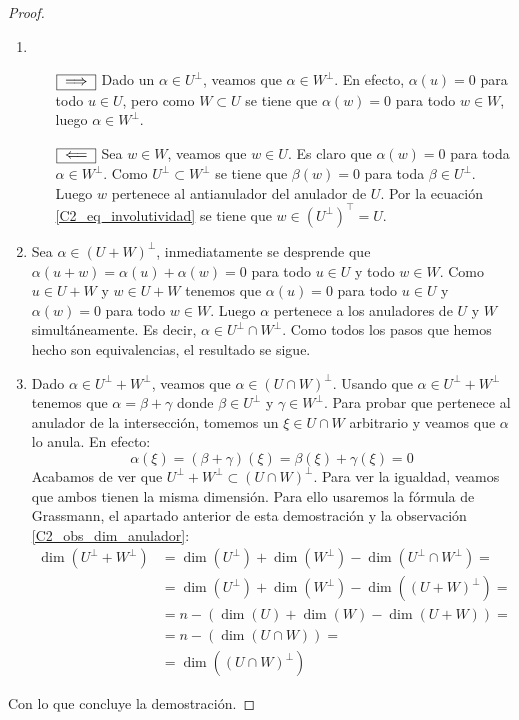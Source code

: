 \begin{proof}
	\begin{enumerate}
		\item \ \ \begin{itemize}
			\item[$\fbox{$\implies$}$] Dado un $\alpha\in U^\perp$, veamos que $\alpha\in W^\perp$. En efecto, $\alpha(u)=0$ para todo $u\in U$, pero como $W\subset U$ se tiene que $\alpha(w)=0$ para todo $w\in W$, luego $\alpha\in W^\perp$.
			
			\item[$\fbox{$\impliedby$}$] Sea $w\in W$, veamos que $w\in U$. Es claro que $\alpha(w)=0$ para toda $\alpha \in W^{\perp}$. Como $U^{\perp}\subset W^{\perp}$ se tiene que $\beta (w)=0$ para toda $\beta\in U^{\perp}$. Luego $w$ pertenece al antianulador del anulador de $U$. Por la ecuación \eqref{C2_eq_involutividad} se tiene que $w\in (U^\perp)^\top=U$.
		\end{itemize}
		
		
		\item Sea $\alpha\in(U+W)^\perp$, inmediatamente se desprende que $\alpha(u+w)=\alpha(u)+\alpha(w)=0$ para todo $u\in U$ y todo $w\in W$. Como $u\in U+W$ y $w\in U+W$ tenemos que $\alpha(u)=0$ para todo $u\in U$ y $\alpha(w)=0$ para todo $w\in W$. Luego $\alpha$ pertenece a los anuladores de $U$ y $W$ simultáneamente. Es decir, $\alpha\in U^\perp\cap W^\perp$. Como todos los pasos que hemos hecho son equivalencias, el resultado se sigue.
		\item Dado $\alpha\in U^\perp + W^\perp$, veamos que $\alpha\in (U\cap W)^\perp$. Usando que $\alpha\in U^\perp + W^\perp$ tenemos que $\alpha=\beta+\gamma$ donde $\beta\in U^\perp$ y $\gamma\in W^\perp$. Para probar que pertenece al anulador de la intersección, tomemos un $\xi\in U\cap W$ arbitrario y veamos que $\alpha$ lo anula. En efecto:
		\[\alpha(\xi)=(\beta+\gamma)(\xi)=\beta(\xi)+\gamma(\xi)=0\]
		Acabamos de ver que $U^\perp+W^\perp\subset(U\cap W)^\perp$. Para ver la igualdad, veamos que ambos tienen la misma dimensión. Para ello usaremos la fórmula de Grassmann, el apartado anterior de esta demostración y la observación \ref{C2_obs_dim_anulador}:
		\begin{align*}
			\dim(U^\perp+W^\perp)&=\dim(U^\perp)+\dim(W^\perp)-\dim(U^\perp\cap W^\perp)=\\
			&=\dim(U^\perp)+\dim(W^\perp)-\dim((U+ W)^\perp)=\\
			&=n-(\dim(U)+\dim(W)-\dim(U+W))=\\
			&=n-(\dim(U\cap W))=\\
			&=\dim((U\cap W)^\perp)
		\end{align*}
	\end{enumerate}
	Con lo que concluye la demostración.
\end{proof}

